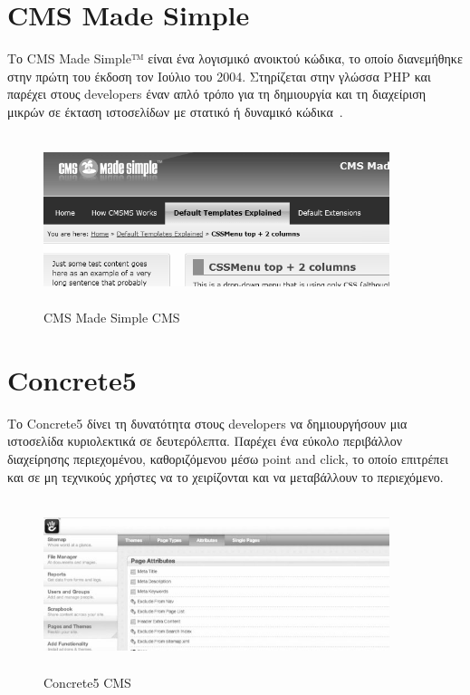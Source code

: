 \documentclass[12pt]{report}
\begin{document}
\section{\textlatin{CMS Made Simple}}
Το \textlatin{CMS Made Simple™} είναι ένα λογισμικό ανοικτού κώδικα, το οποίο διανεμήθηκε στην πρώτη του έκδοση τον Ιούλιο του 2004. Στηρίζεται στην γλώσσα \textlatin{PHP} και παρέχει στους \textlatin{developers} έναν απλό τρόπο για τη δημιουργία και τη διαχείριση μικρών σε έκταση ιστοσελίδων με στατικό ή δυναμικό κώδικα~\cite{gongea}.
\begin{figure}[H]
\centering
\includegraphics[width=0.9\textwidth, height=5cm]{cms_made_simple-gray}
\caption{\textlatin{CMS Made Simple CMS}}
\label{fig:made_simpl}
\end{figure}

\section{\textlatin{Concrete5}}
Το \textlatin{Concrete5} δίνει τη δυνατότητα στους \textlatin{developers} να δημιουργήσουν μια ιστοσελίδα κυριολεκτικά σε δευτερόλεπτα. Παρέχει ένα εύκολο περιβάλλον διαχείρησης περιεχομένου, καθοριζόμενου μέσω \textlatin{point and click}, το οποίο επιτρέπει και σε μη τεχνικούς χρήστες να το χειρίζονται και να μεταβάλλουν το περιεχόμενο.
\begin{figure}[H]
\centering
\includegraphics[width=0.9\textwidth, height=5cm]{Concrete5-gray}
\caption{\textlatin{Concrete5 CMS}}
\label{fig:concrete5}
\end{figure}
\end{document}
